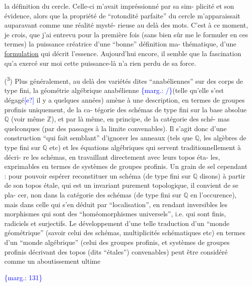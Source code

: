 \documentclass[11pt]{article}
\newcommand{\scanpage}[1]{\par\bigskip\noindent{\small\sffamily[scan #1]}\par}
\newcommand{\mspage}[1]{{\small\sffamily[p.\,#1]}}
\newcommand{\hand}[1]{\textcolor{blue}{#1}}
\newcommand{\margin}[1]{\textcolor{blue}{\{\textsf{marg.:} #1\}}}
\newcommand{\uline}[1]{\underline{#1}}
\newcommand{\unsure}[1]{[#1?]}
\begin{document}
la définition du cercle. Celle-ci m'avait impréssionné par sa sim-%
plicité et son évidence, alors que la propriété de ``rotondité
parfaite'' du cercle m'apparaissait auparavant comme une réalité mysté-%
rieuse au delà des mots. C'est à ce moment, je crois, que j'ai
entrevu pour la première fois (sans bien sûr me le formuler en
ces termes) la puissance créatrice d'une ``bonne'' définition ma-%
thématique, d'une \uline{formulation} qui décrit l'essence. Aujourd'hui
encore, il semble que la fascination qu'a exercé sur moi cette
puissance-là n'a rien perdu de sa force.

(\textsuperscript{3}) Plus généralement, au delà des variétés dites ``anabéliennes''
sur des corps de type fini, la géométrie algébrique anabélienne
\margin{/}(telle qu'elle s'est dégagé\hand{\unsure{e}} il y a quelques années) amène à une
description, en termes de groupes profinis uniquement, de la ca-%
tégorie des schémas de type fini sur la base absolue $\mathbb{Q}$ (voir
même $\mathbb{Z}$), et par là même, en principe, de la catégorie des sché-%
mas quelconques (par des passages à la limite convenables). Il
s'agit donc d'une construction ``qui fait semblant'' d'ignorer les
anneaux (tels que $\mathbb{Q}$, les algèbres de type fini sur $\mathbb{Q}$ etc) et
les équations algébriques qui servent traditionnellement à décri-%
re les schémas, en travaillant directement avec leurs topos éta-%
les, exprimables en termes de systèmes de groupes profinis. Un
grain de sel cependant : pour pouvoir espérer reconstituer un
schéma (de type fini sur $\mathbb{Q}$ disons) à partir de son topos étale,
qui est un invariant purement topologique, il convient de se pla-%
cer, non dans la catégorie des schémas (de type fini sur $\mathbb{Q}$ en
l'occurence), mais dans celle qui s'en déduit par ``localisation'',
en rendant inversibles les morphismes qui sont des ``homéomorphismes
universels'', i.e. qui sont finis, radiciels et surjectifs. Le
développement d'une telle traduction d'un ``monde géométrique''
(savoir celui des schémas, multiplicités schématiques etc) en
termes d'un ``monde algébrique'' (celui des groupes profinis, et
systèmes de groupes profinis décrivant des topos (dits ``étales'')
convenables) peut être considéré comme un aboutissement ultime

\margin{131}

\clearpage
\scanpage{119/132}
\mspage{54}
\end{document}
